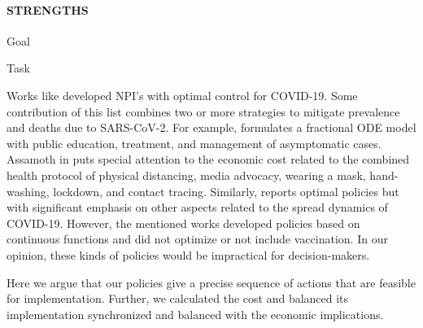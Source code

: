    \paragraph{STRENGTHS}
        \begin{CheckList}{Goal}
                \begin{CheckList}{Task}
                \end{CheckList}
        \end{CheckList}
        
        Works like 
    \cite{Perkins2020,Palmer2020,Djidjou2020,Asamoah2021,Nabi2021} 
    developed NPI's with optimal control for COVID-19. Some 
    contribution of this list  combines two or more strategies to
    mitigate prevalence and deaths due to SARS-CoV-2. For example,
    \cite{Nabi2021} formulates a fractional ODE model with public
    education, treatment, and management of asymptomatic cases.  
    Assamoth in \cite{Asamoah2021} puts 
    special attention to the economic cost related to the combined 
    health protocol of physical distancing, media advocacy,  
    wearing a mask, hand-washing, lockdown, and contact tracing. 
    Similarly, \cite{Djomegni2021,Jiang2020,Ullah2020}
    reports optimal policies but with significant emphasis on
    other aspects related to the spread dynamics of COVID-19.
    However, the mentioned works developed policies based on
    continuous functions and did not optimize or not include 
    vaccination. In our opinion, these kinds of policies would 
    be impractical for decision-makers. 
	    
	    Here we argue that our policies give a precise sequence 
	of actions that are feasible for implementation. Further, we 
	calculated the cost and balanced its implementation 
	synchronized and balanced with the economic implications.

